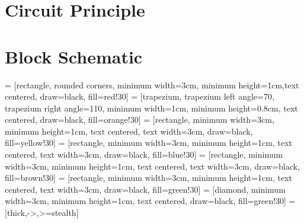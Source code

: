 \documentclass[12pt]{article}
\begin{document}
\clearpage
\section{Circuit Principle}

\section{Block Schematic}

\thispagestyle{empty}
 = [rectangle, rounded corners, minimum width=3cm, minimum height=1cm,text centered, draw=black, fill=red!30]
 = [trapezium, trapezium left angle=70, trapezium right angle=110, minimum width=1cm, minimum height=0.8cm, text centered, draw=black, fill=orange!30]
 = [rectangle, minimum width=3cm, minimum height=1cm, text centered, text width=3cm, draw=black, fill=yellow!30]
 = [rectangle, minimum width=3cm, minimum height=1cm, text centered, text width=3cm, draw=black, fill=blue!30]
 = [rectangle, minimum width=3cm, minimum height=1cm, text centered, text width=3cm, draw=black, fill=brown!30]
 = [rectangle, minimum width=3cm, minimum height=1cm, text centered, text width=3cm, draw=black, fill=green!30]
 = [diamond, minimum width=3cm, minimum height=1cm, text centered, draw=black, fill=green!30]
 = [thick,->,>=stealth]
\end{document}
